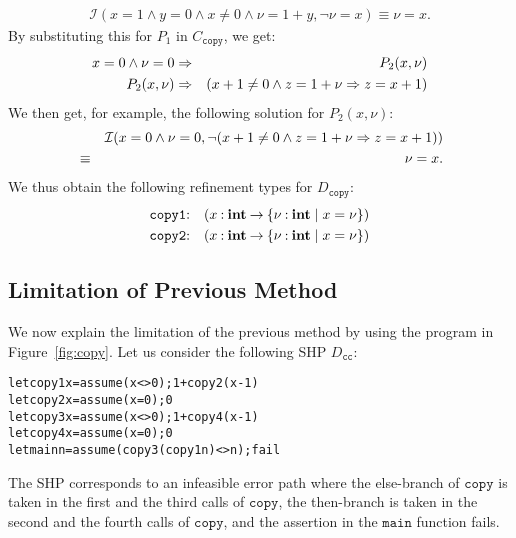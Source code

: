 \begin{eqnarray*}
\mathcal{I}(x=1 \land y=0 \land x\neq0 \land \nu=1+y,\neg \nu=x)
\equiv \nu=x.
\end{eqnarray*}
By substituting this for \(P_1\) in \(C_{\texttt{copy}}\), we get:
\begin{eqnarray*}
x=0 \land \nu=0 &\Rightarrow& P_2(x,\nu) \\
P_2(x,\nu) &\Rightarrow& (x+1\neq0 \land z=1+\nu \Rightarrow z=x+1)
\end{eqnarray*}
We then get, for example, the following solution for \(P_2(x,\nu)\):
\begin{eqnarray*}
&&\mathcal{I}(x=0 \land \nu=0,\neg (x+1\neq0 \land z=1+\nu \Rightarrow z=x+1)) \\
&\equiv& \nu=x.
\end{eqnarray*}
We thus obtain the following refinement types for \(D_{\texttt{copy}}\):
\begin{eqnarray*}
\texttt{copy1}&\mathbin{:}&(x\mathbin{:}{\mathbf{int}}\mathbin{\rightarrow}{\{{\nu\mathbin{:}\mathbf{int} \mid x=\nu}\}}) \\
\texttt{copy2}&\mathbin{:}&(x\mathbin{:}{\mathbf{int}}\mathbin{\rightarrow}{\{{\nu\mathbin{:}\mathbf{int} \mid x=\nu}\}})
\end{eqnarray*}

\subsection{Limitation of Previous Method}
\label{sec:limit}

We now explain the limitation of the previous method by using the
program in Figure~\ref{fig:copy}.  Let us consider the following SHP
\(D_{\texttt{cc}}\):
\begin{alltt}
let copy1 x = assume (x<>0); 1 + copy2 (x-1)
let copy2 x = assume (x=0); 0
let copy3 x = assume (x<>0); 1 + copy4 (x-1)
let copy4 x = assume (x=0); 0
let main n = assume (copy3 (copy1 n) <> n); fail
\end{alltt}
The SHP corresponds to an infeasible error path where the else-branch of
\(\texttt{copy}\) is taken in the first and the third calls of
\(\texttt{copy}\), the then-branch is taken in the second and the fourth
calls of \(\texttt{copy}\), and the assertion in the \(\texttt{main}\)
function fails.

